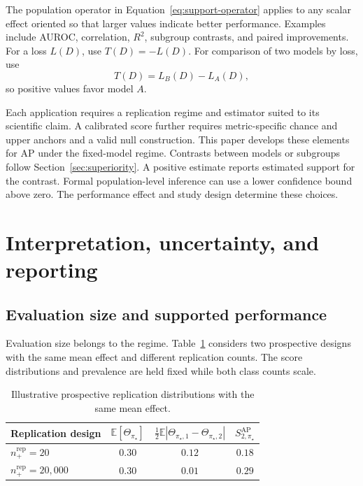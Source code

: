 \documentclass[11pt]{article}
\newcommand{\E}{\mathbb{E}}
\newcommand{\SAP}{S_{2,\pi_\star}^{\mathrm{AP}}}
\theoremstyle{remark}
\begin{document}
The population operator in Equation~\eqref{eq:support-operator} applies to any scalar effect oriented so that larger values indicate better performance. Examples include AUROC, correlation, $R^2$, subgroup contrasts, and paired improvements. For a loss $L(D)$, use $T(D)=-L(D)$. For comparison of two models by loss, use
\[
T(D)=L_B(D)-L_A(D),
\]
so positive values favor model $A$.

Each application requires a replication regime and estimator suited to its scientific claim. A calibrated score further requires metric-specific chance and upper anchors and a valid null construction. This paper develops these elements for AP under the fixed-model regime. Contrasts between models or subgroups follow Section~\ref{sec:superiority}. A positive estimate reports estimated support for the contrast. Formal population-level inference can use a lower confidence bound above zero. The performance effect and study design determine these choices.

\section{Interpretation, uncertainty, and reporting}
\label{sec:interpretation}

\subsection{Evaluation size and supported performance}

Evaluation size belongs to the regime. Table~\ref{tab:illustration} considers two prospective designs with the same mean effect and different replication counts. The score distributions and prevalence are held fixed while both class counts scale.

\begin{table}[ht]
\centering
\caption{Illustrative prospective replication distributions with the same mean effect.}
\label{tab:illustration}
\begin{tabular}{@{}lccc@{}}
\toprule
Replication design & $\E[\Theta_{\pi_\star}]$ & $\tfrac12\E|\Theta_{\pi_\star,1}-\Theta_{\pi_\star,2}|$ & $\SAP$ \\
\midrule
$n_+^{\mathrm{rep}}=20$ & $0.30$ & $0.12$ & $0.18$ \\
$n_+^{\mathrm{rep}}=20{,}000$ & $0.30$ & $0.01$ & $0.29$ \\
\bottomrule
\end{tabular}
\end{table}
\end{document}
